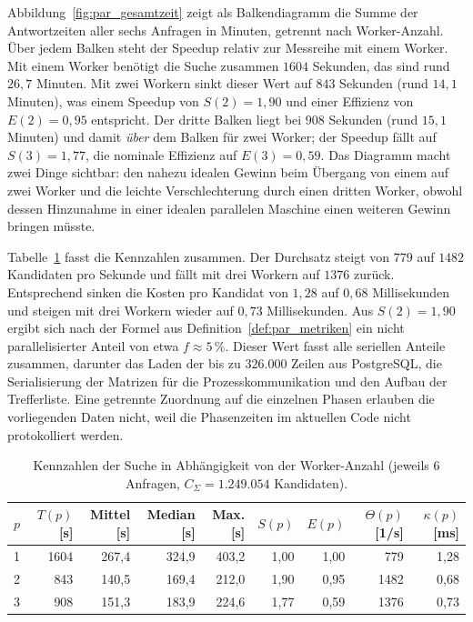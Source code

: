 \documentclass[a4paper,12pt, twoside]{report}
\theoremstyle{definition}
\begin{document}
Abbildung~\ref{fig:par_gesamtzeit} zeigt als Balkendiagramm die Summe der Antwortzeiten aller sechs Anfragen in Minuten, getrennt nach Worker-Anzahl. Über jedem Balken steht der Speedup relativ zur Messreihe mit einem Worker. Mit einem Worker benötigt die Suche zusammen $1604$ Sekunden, das sind rund $26{,}7$ Minuten. Mit zwei Workern sinkt dieser Wert auf $843$ Sekunden (rund $14{,}1$ Minuten), was einem Speedup von $S(2)=1{,}90$ und einer Effizienz von $E(2)=0{,}95$ entspricht. Der dritte Balken liegt bei $908$ Sekunden (rund $15{,}1$ Minuten) und damit \emph{über} dem Balken für zwei Worker; der Speedup fällt auf $S(3)=1{,}77$, die nominale Effizienz auf $E(3)=0{,}59$. Das Diagramm macht zwei Dinge sichtbar: den nahezu idealen Gewinn beim Übergang von einem auf zwei Worker und die leichte Verschlechterung durch einen dritten Worker, obwohl dessen Hinzunahme in einer idealen parallelen Maschine einen weiteren Gewinn bringen müsste.

Tabelle~\ref{tab:par_summary} fasst die Kennzahlen zusammen. Der Durchsatz steigt von $779$ auf $1482$ Kandidaten pro Sekunde und fällt mit drei Workern auf $1376$ zurück. Entsprechend sinken die Kosten pro Kandidat von $1{,}28$ auf $0{,}68$ Millisekunden und steigen mit drei Workern wieder auf $0{,}73$ Millisekunden. Aus $S(2)=1{,}90$ ergibt sich nach der Formel aus Definition~\ref{def:par_metriken} ein nicht parallelisierter Anteil von etwa $f\approx 5\,\%$. Dieser Wert fasst alle seriellen Anteile zusammen, darunter das Laden der bis zu $326.000$ Zeilen aus PostgreSQL, die Serialisierung der Matrizen für die Prozesskommunikation und den Aufbau der Trefferliste. Eine getrennte Zuordnung auf die einzelnen Phasen erlauben die vorliegenden Daten nicht, weil die Phasenzeiten im aktuellen Code nicht protokolliert werden.

\begin{table}[h]
	\centering
	\small
	\caption{Kennzahlen der Suche in Abhängigkeit von der Worker-Anzahl (jeweils $6$ Anfragen, $C_\Sigma = 1.249.054$ Kandidaten).}
	\label{tab:par_summary}
	\begin{tabular}{@{}rrrrrrrrr@{}}
		\toprule
		$p$ & $T(p)$ [s] & Mittel [s] & Median [s] & Max. [s] & $S(p)$ & $E(p)$ & $\Theta(p)$ [1/s] & $\kappa(p)$ [ms] \\
		\midrule
		1 & 1604 & 267{,}4 & 324{,}9 & 403{,}2 & 1{,}00 & 1{,}00 & 779  & 1{,}28 \\
		2 &  843 & 140{,}5 & 169{,}4 & 212{,}0 & 1{,}90 & 0{,}95 & 1482 & 0{,}68 \\
		3 &  908 & 151{,}3 & 183{,}9 & 224{,}6 & 1{,}77 & 0{,}59 & 1376 & 0{,}73 \\
		\bottomrule
	\end{tabular}
\end{table}
\end{document}
